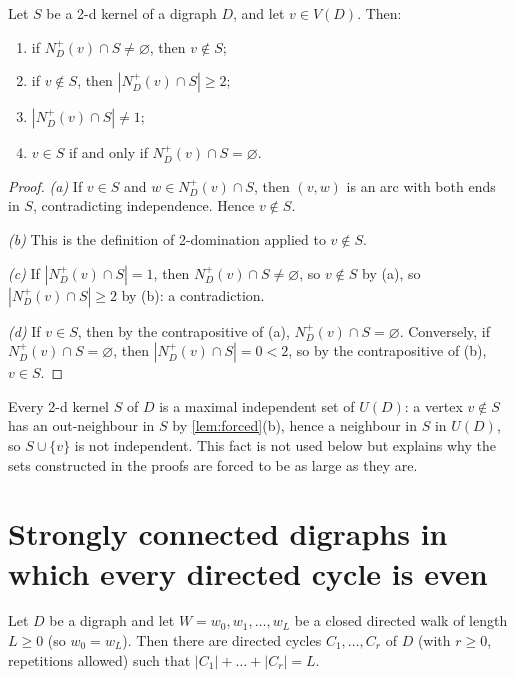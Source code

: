\documentclass[11pt]{article}
\numberwithin{equation}{section}
\theoremstyle{plain}
\newcommand{\V}{V}
\newcommand{\Np}{N^{+}}
\newcommand{\und}{U}                       %
\begin{document}
\begin{lemma}\label{lem:forced}
Let $S$ be a 2-d kernel of a digraph $D$, and let $v\in\V(D)$. Then:
\begin{enumerate}[label=\textup{(\alph*)},leftmargin=2.4em]
\item if $\Np_D(v)\cap S\neq\varnothing$, then $v\notin S$;
\item if $v\notin S$, then $|\Np_D(v)\cap S|\ge 2$;
\item $|\Np_D(v)\cap S|\neq 1$;
\item $v\in S$ if and only if $\Np_D(v)\cap S=\varnothing$.
\end{enumerate}
\end{lemma}

\begin{proof}
\emph{(a)} If $v\in S$ and $w\in\Np_D(v)\cap S$, then $(v,w)$ is an arc with both ends in
$S$, contradicting independence. Hence $v\notin S$.

\emph{(b)} This is the definition of 2-domination applied to $v\notin S$.

\emph{(c)} If $|\Np_D(v)\cap S|=1$, then $\Np_D(v)\cap S\neq\varnothing$, so $v\notin S$
by (a), so $|\Np_D(v)\cap S|\ge 2$ by (b): a contradiction.

\emph{(d)} If $v\in S$, then by the contrapositive of (a), $\Np_D(v)\cap S=\varnothing$.
Conversely, if $\Np_D(v)\cap S=\varnothing$, then $|\Np_D(v)\cap S|=0<2$, so by the
contrapositive of (b), $v\in S$.
\end{proof}

\begin{remark}\label{rem:mis}
Every 2-d kernel $S$ of $D$ is a maximal independent set of $\und(D)$: a vertex
$v\notin S$ has an out-neighbour in $S$ by \cref{lem:forced}(b), hence a neighbour in
$S$ in $\und(D)$, so $S\cup\{v\}$ is not independent. This fact is not used below but
explains why the sets constructed in the proofs are forced to be as large as they are.
\end{remark}

\section{Strongly connected digraphs in which every directed cycle is even}
\label{sec:B}

\begin{lemma}\label{lem:cycdecomp}
Let $D$ be a digraph and let $W=w_0,w_1,\dots,w_L$ be a closed directed walk of length
$L\ge 0$ (so $w_0=w_L$). Then there are directed cycles $C_1,\dots,C_r$ of $D$
(with $r\ge 0$, repetitions allowed) such that $|C_1|+\dots+|C_r|=L$.
\end{lemma}
\end{document}
